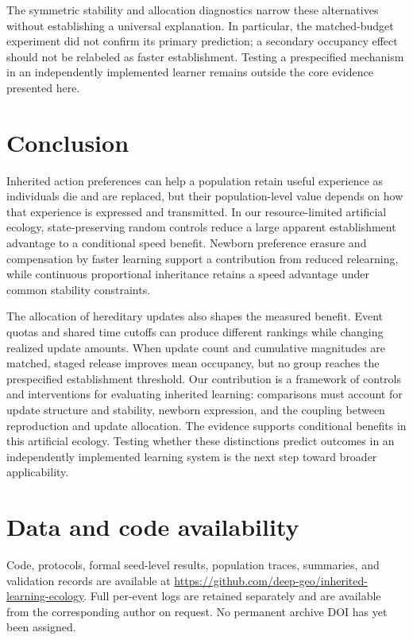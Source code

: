 \documentclass[11pt]{article}
\begin{document}
The symmetric stability and allocation diagnostics narrow these alternatives without establishing a universal explanation. In particular, the matched-budget experiment did not confirm its primary prediction; a secondary occupancy effect should not be relabeled as faster establishment. Testing a prespecified mechanism in an independently implemented learner remains outside the core evidence presented here.

\section{Conclusion}
Inherited action preferences can help a population retain useful experience as individuals die and are replaced, but their population-level value depends on how that experience is expressed and transmitted. In our resource-limited artificial ecology, state-preserving random controls reduce a large apparent establishment advantage to a conditional speed benefit. Newborn preference erasure and compensation by faster learning support a contribution from reduced relearning, while continuous proportional inheritance retains a speed advantage under common stability constraints.

The allocation of hereditary updates also shapes the measured benefit. Event quotas and shared time cutoffs can produce different rankings while changing realized update amounts. When update count and cumulative magnitudes are matched, staged release improves mean occupancy, but no group reaches the prespecified establishment threshold. Our contribution is a framework of controls and interventions for evaluating inherited learning: comparisons must account for update structure and stability, newborn expression, and the coupling between reproduction and update allocation. The evidence supports conditional benefits in this artificial ecology. Testing whether these distinctions predict outcomes in an independently implemented learning system is the next step toward broader applicability.

\section*{Data and code availability}
Code, protocols, formal seed-level results, population traces, summaries, and validation records are available at \url{https://github.com/deep-geo/inherited-learning-ecology}. Full per-event logs are retained separately and are available from the corresponding author on request. No permanent archive DOI has yet been assigned.
\end{document}

